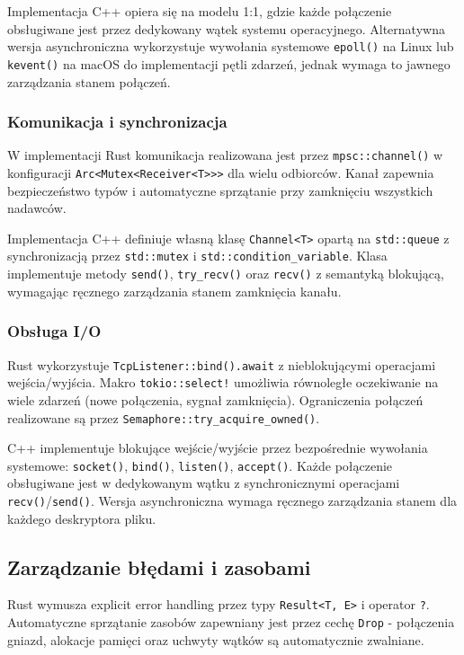 Implementacja C++ opiera się na modelu 1:1, gdzie każde połączenie obsługiwane jest przez dedykowany wątek systemu operacyjnego. Alternatywna wersja asynchroniczna wykorzystuje wywołania systemowe \texttt{epoll()} na Linux lub \texttt{kevent()} na macOS do implementacji pętli zdarzeń, jednak wymaga to jawnego zarządzania stanem połączeń.

\subsubsection{Komunikacja i synchronizacja}

W implementacji Rust komunikacja realizowana jest przez \texttt{mpsc::channel()} w konfiguracji \texttt{Arc<Mutex<Receiver<T>>>} dla wielu odbiorców. Kanał zapewnia bezpieczeństwo typów i automatyczne sprzątanie przy zamknięciu wszystkich nadawców.

Implementacja C++ definiuje własną klasę \texttt{Channel<T>} opartą na \texttt{std::queue} z synchronizacją przez \texttt{std::mutex} i \texttt{std::condition\_variable}. Klasa implementuje metody \texttt{send()}, \texttt{try\_recv()} oraz \texttt{recv()} z semantyką blokującą, wymagając ręcznego zarządzania stanem zamknięcia kanału.

\subsubsection{Obsługa I/O}

Rust wykorzystuje \texttt{TcpListener::bind().await} z nieblokującymi operacjami wejścia/wyjścia. Makro \texttt{tokio::select!} umożliwia równoległe oczekiwanie na wiele zdarzeń (nowe połączenia, sygnał zamknięcia). Ograniczenia połączeń realizowane są przez \texttt{Semaphore::try\_acquire\_owned()}.

C++ implementuje blokujące wejście/wyjście przez bezpośrednie wywołania systemowe: \texttt{socket()}, \texttt{bind()}, \texttt{listen()}, \texttt{accept()}. Każde połączenie obsługiwane jest w dedykowanym wątku z synchronicznymi operacjami \texttt{recv()}/\texttt{send()}. Wersja asynchroniczna wymaga ręcznego zarządzania stanem dla każdego deskryptora pliku.

\subsection{Zarządzanie błędami i zasobami}

Rust wymusza explicit error handling przez typy \texttt{Result<T, E>} i operator \texttt{?}. Automatyczne sprzątanie zasobów zapewniany jest przez cechę \texttt{Drop} - połączenia gniazd, alokacje pamięci oraz uchwyty wątków są automatycznie zwalniane.

